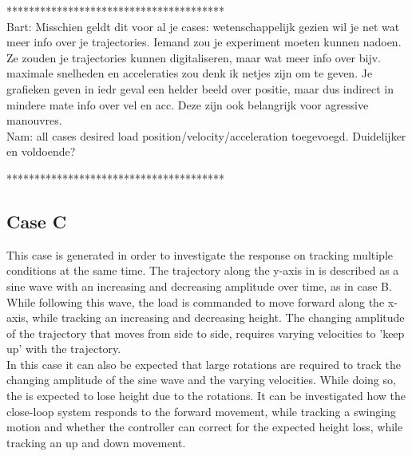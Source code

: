***************************************\\
Bart: Misschien geldt dit voor al je cases: wetenschappelijk gezien wil je net wat meer info over je trajectories.  Iemand zou je experiment moeten kunnen nadoen. Ze zouden je trajectories kunnen digitaliseren, maar wat meer info over bijv. maximale snelheden en acceleraties zou denk ik netjes zijn om te geven. Je grafieken geven in iedr geval een helder beeld over positie, maar dus indirect in mindere mate info over vel en acc. Deze zijn ook belangrijk voor agressive manouvres.\\
Nam: all cases desired load position/velocity/acceleration toegevoegd. Duidelijker en voldoende?

***************************************\\

\subsection*{Case C}
This case is generated in order to investigate the response on tracking multiple conditions at the same time.  
The trajectory along the y-axis in \IF is described as a sine wave with an increasing and decreasing amplitude over time, as in case B.
While following this wave, the load is commanded to move forward along the x-axis, while tracking an increasing and decreasing height.
The changing amplitude of the trajectory that moves from side to side, requires varying velocities to 'keep up' with the trajectory. \\
In this case it can also be expected that large  rotations are required to track the changing amplitude of the sine wave and the varying velocities.
While doing so, the  is expected to lose height due to the rotations.
It can be investigated how the close-loop system responds to the forward movement, while tracking a swinging motion and whether the controller can correct for the expected height loss, while tracking an up and down movement. 

